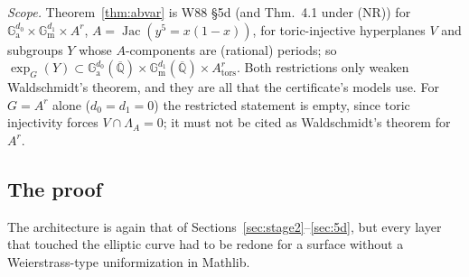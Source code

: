 \documentclass[11pt]{amsart}
\theoremstyle{definition}
\theoremstyle{remark}
\numberwithin{equation}{section}
\newcommand{\Qbar}{\overline{\mathbb{Q}}}
\newcommand{\Ga}{\mathbb{G}_{\mathrm{a}}}
\newcommand{\Gm}{\mathbb{G}_{\mathrm{m}}}
\newcommand{\NR}{\textup{(NR)}}
\begin{document}
\emph{Scope.} Theorem~\ref{thm:abvar} is W88 \S5d (and Thm.~4.1 under \NR) for $\Ga^{d_0}\times\Gm^{d_1}\times A^r$,
$A=\operatorname{Jac}(y^5=x(1-x))$, for toric-injective hyperplanes $V$ and subgroups $Y$ whose $A$-components
are (rational) periods; so $\exp_G(Y)\subset\Ga^{d_0}(\Qbar)\times\Gm^{d_1}(\Qbar)\times A^r_{\mathrm{tors}}$. Both
restrictions only weaken Waldschmidt's theorem, and they are all that the certificate's models use. For
$G=A^r$ alone ($d_0=d_1=0$) the restricted statement is empty, since toric injectivity forces
$V\cap\Lambda_A=0$; it must not be cited as Waldschmidt's theorem for $A^r$.

\subsection{The proof}
The architecture is again that of Sections~\ref{sec:stage2}--\ref{sec:5d}, but every layer that touched the
elliptic curve had to be redone for a surface without a Weierstrass-type uniformization in Mathlib.
\end{document}
